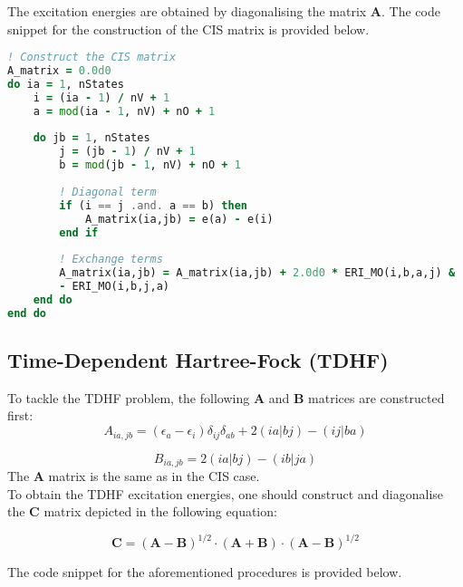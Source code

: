 \documentclass[12pt]{article}
\begin{document}
The excitation energies are obtained by diagonalising the matrix \(\mathbf{A}\). The code snippet for the construction of the CIS matrix is provided below.

\begin{lstlisting}[language=Fortran, firstnumber=24, label={lst:CIS}, caption=Subroutine for the CIS matrix construction. Only part of the full code is mentioned.]
! Construct the CIS matrix
A_matrix = 0.0d0
do ia = 1, nStates
    i = (ia - 1) / nV + 1
    a = mod(ia - 1, nV) + nO + 1
    
    do jb = 1, nStates
        j = (jb - 1) / nV + 1
        b = mod(jb - 1, nV) + nO + 1
        
        ! Diagonal term
        if (i == j .and. a == b) then
            A_matrix(ia,jb) = e(a) - e(i)
        end if
        
        ! Exchange terms
        A_matrix(ia,jb) = A_matrix(ia,jb) + 2.0d0 * ERI_MO(i,b,a,j) &
        - ERI_MO(i,b,j,a)
    end do
end do
\end{lstlisting}

\subsection*{Time-Dependent Hartree-Fock (TDHF)}
To tackle the TDHF problem, the following \(\mathbf{A}\) and \(\mathbf{B}\) matrices are constructed first:
\begin{equation}
    A_{ia, jb} = (\epsilon_a - \epsilon_i) \delta_{ij} \delta_{ab} + 2 (ia|bj) - (ij|ba)
\end{equation}

\begin{equation}
    B_{ia, jb} = 2 (ia|bj) - (ib|ja)
\end{equation}
The \(\mathbf{A}\) matrix is the same as in the CIS case. \\

To obtain the TDHF excitation energies, one should construct and diagonalise the \(\mathbf{C}\) matrix depicted in the following equation:

\begin{equation}
    \mathbf{C} = (\mathbf{A} - \mathbf{B})^{1/2} \cdot (\mathbf{A} + \mathbf{B}) \cdot (\mathbf{A} - \mathbf{B})^{1/2}
\end{equation}

The code snippet for the aforementioned procedures is provided below.
\end{document}
